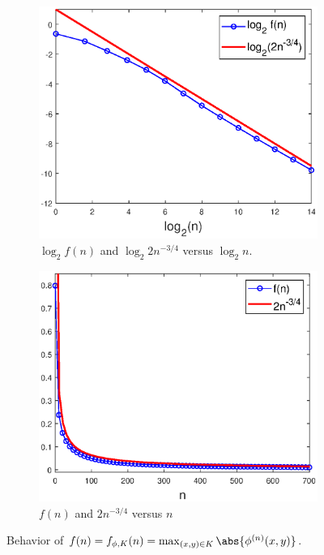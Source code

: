 \documentclass[11pt, letter]{book}
\newenvironment{example}
  {\pushQED{\qed}\renewcommand{\qedsymbol}{$\triangle$}\examplex}
  {\popQED\endexamplex}
\begin{document}
\begin{example}
\begin{figure}[!htb]
    \begin{subfigure}{0.49\textwidth}
    \centering
    \includegraphics[scale=0.58]{Fig7a.eps}
    \caption{$\log_2 f(n)$ and  $\log_2 2n^{-3/4}$ versus $\log_2 n$.}
    \end{subfigure}
    \begin{subfigure}{0.49\textwidth}
    \centering
    \includegraphics[scale=0.58]{Fig7b.eps}
    \caption{$f(n)$ and $2n^{-3/4}$ versus $n$}
    \end{subfigure}
    \caption{Behavior of $f(n)=f_{\phi,K}(n)=\max_{(x,y)\in K}\abs{\phi^{(n)}(x,y)}$.}
    \label{fig:Conv_Pwr_2}
\end{figure}


\end{example}
\end{document}
